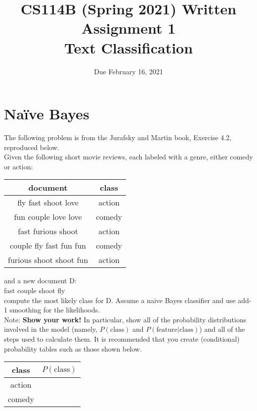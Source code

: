 \documentclass[11pt,letterpaper]{article}
\begin{document}
\title{CS114B (Spring 2021) Written Assignment 1\\Text Classification}
\author{Due February 16, 2021}
\date{}
\maketitle

\section{Na\"ive Bayes}

The following problem is from the Jurafsky and Martin book, Exercise 4.2, reproduced below.\\

\noindent Given the following short movie reviews, each labeled with a genre, either comedy or action:

\begin{center}
\begin{tabular}{|c|c|}
\hline 
document & class \\ 
\hline 
fly fast shoot love & action \\ 
\hline 
fun couple love love & comedy \\ 
\hline 
fast furious shoot & action \\ 
\hline 
couple fly fast fun fun & comedy \\ 
\hline 
furious shoot shoot fun & action \\ 
\hline 
\end{tabular} 
\end{center}

\noindent and a new document D:\\

fast couple shoot fly\\

\noindent compute the most likely class for D. Assume a naive Bayes classifier and use add-1 smoothing for the likelihoods.\\

\noindent Note: \textbf{Show your work!} In particular, show all of the probability distributions involved in the model (namely, $P(\mathrm{class})$ and $P(\mathrm{feature|class})$) and all of the steps used to calculate them. It is recommended that you create (conditional) probability tables such as those shown below.\newpage

\begin{center}
\begin{tabular}{|c|c|}
\hline 
class & $P(\mathrm{class})$ \\ 
\hline 
action &  \\ 
\hline 
comedy &  \\ 
\hline 
\end{tabular} 
\end{center}
\end{document}
